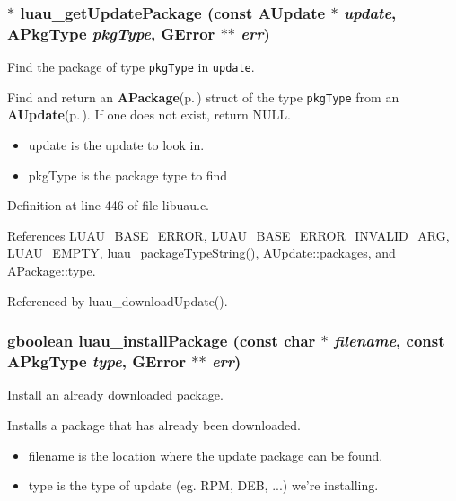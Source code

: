\subsubsection{$\ast$ luau\_\-get\-Update\-Package (const {\bf AUpdate} $\ast$ {\em update}, {\bf APkg\-Type} {\em pkg\-Type}, GError $\ast$$\ast$ {\em err})}\label{libuau_8h_a73}


Find the package of type {\tt pkg\-Type} in {\tt update}. 

Find and return an {\bf APackage}{\rm (p.\,\pageref{structAPackage})} struct of the type {\tt pkg\-Type} from an {\bf AUpdate}{\rm (p.\,\pageref{structAUpdate})}. If one does not exist, return NULL.

\begin{itemize}
\item update is the update to look in. \item pkg\-Type is the package type to find 
\end{itemize}


Definition at line 446 of file libuau.c.

References LUAU\_\-BASE\_\-ERROR, LUAU\_\-BASE\_\-ERROR\_\-INVALID\_\-ARG, LUAU\_\-EMPTY, luau\_\-package\-Type\-String(), AUpdate::packages, and APackage::type.

Referenced by luau\_\-download\-Update().
\subsubsection{\setlength{\rightskip}{0pt plus 5cm}gboolean luau\_\-install\-Package (const char $\ast$ {\em filename}, const {\bf APkg\-Type} {\em type}, GError $\ast$$\ast$ {\em err})}\label{libuau_8h_a57}


Install an already downloaded package. 

Installs a package that has already been downloaded.

\begin{itemize}
\item filename is the location where the update package can be found. \item type is the type of update (eg. RPM, DEB, ...) we're installing. 
\end{itemize}


